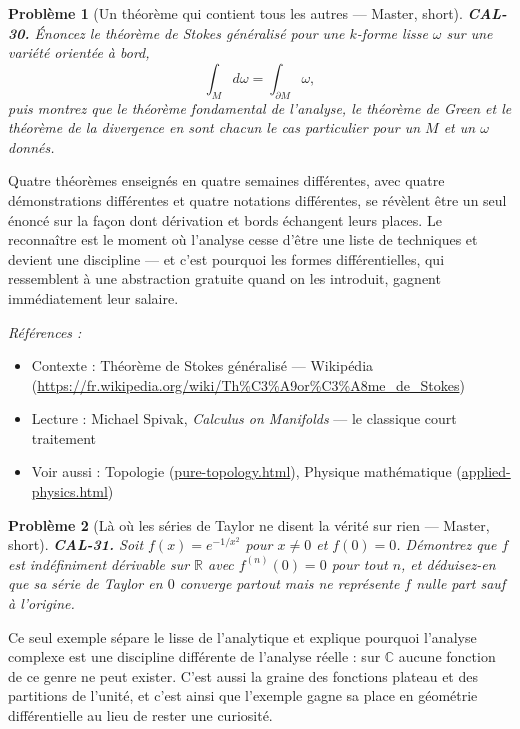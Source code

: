 \documentclass[11pt]{article}
\newtheorem{problem}{Problème}
\newenvironment{refs}{\par\small\noindent\emph{Références :}\begin{itemize}\setlength\itemsep{0pt}}{\end{itemize}\normalsize}
\begin{document}
\bigskip

\begin{problem}[{Un théorème qui contient tous les autres --- Master, short}]
\textbf{CAL-30.} Énoncez le théorème de Stokes généralisé pour une
$ k $-forme lisse $ \omega $ sur une variété orientée à bord,
\[ \int_{M} d\omega = \int_{\partial M} \omega , \]
puis montrez que le théorème fondamental de l'analyse, le théorème de Green et le théorème
de la divergence en sont chacun le cas particulier pour un $ M $ et un $ \omega $ donnés.
\end{problem}

\noindent Quatre théorèmes enseignés en quatre semaines différentes, avec quatre
démonstrations différentes et quatre notations différentes, se révèlent être un seul énoncé sur la façon dont
dérivation et bords échangent leurs places. Le reconnaître est le moment où l'analyse cesse
d'être une liste de techniques et devient une discipline --- et c'est pourquoi les formes différentielles, qui
ressemblent à une abstraction gratuite quand on les introduit, gagnent immédiatement leur salaire.

\begin{refs}
\item Contexte : Théorème de Stokes généralisé --- Wikipédia (\url{https://fr.wikipedia.org/wiki/Th%C3%A9or%C3%A8me_de_Stokes})
\item Lecture : Michael Spivak, \textit{Calculus on Manifolds} --- le classique court traitement
\item Voir aussi : Topologie (\url{pure-topology.html}), Physique mathématique (\url{applied-physics.html})
\end{refs}

\bigskip

\begin{problem}[{Là où les séries de Taylor ne disent la vérité sur rien --- Master, short}]
\textbf{CAL-31.} Soit $ f(x) = e^{-1/x^2} $ pour $ x \neq 0 $ et $ f(0) = 0 $. Démontrez que $ f $ est indéfiniment dérivable sur $ \mathbb{R} $ avec $ f^{(n)}(0) = 0 $ pour tout $ n $, et déduisez-en que sa série de Taylor en $ 0 $ converge partout mais ne représente $ f $ nulle part sauf à l'origine.
\end{problem}

\noindent Ce seul exemple sépare le lisse de l'analytique et explique pourquoi l'analyse complexe est une discipline différente de l'analyse réelle : sur $ \mathbb{C} $ aucune fonction de ce genre ne peut exister. C'est aussi la graine des fonctions plateau et des partitions de l'unité, et c'est ainsi que l'exemple gagne sa place en géométrie différentielle au lieu de rester une curiosité.
\end{document}

